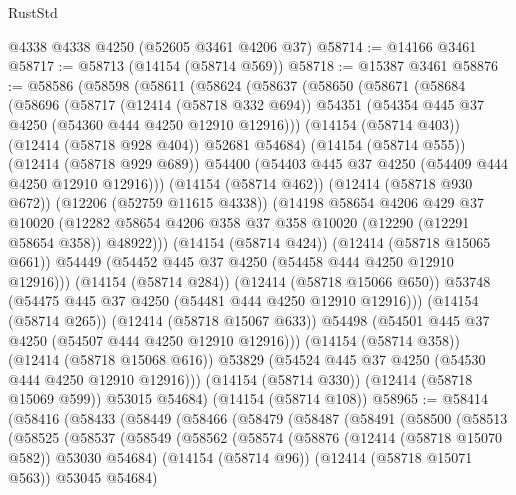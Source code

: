 \begin{lexlean}{RustStd}
\begin{coremodule}
    @4338
    @4338
    @4250
    (@52605 @3461 @4206 @37)
@58714 := @14166 @3461
@58717 := @58713 (@14154 (@58714 @569))
@58718 := @15387 @3461
@58876 := @58586
    (@58598
      (@58611
        (@58624
          (@58637
            (@58650
              (@58671
                (@58684
                  (@58696
                    (@58717
                      (@12414 (@58718 @332 @694))
                      @54351
                      (@54354 @445 @37 @4250 (@54360 @444 @4250 @12910 @12916)))
                    (@14154 (@58714 @403))
                    (@12414 (@58718 @928 @404))
                    @52681
                    @54684)
                  (@14154 (@58714 @555))
                  (@12414 (@58718 @929 @689))
                  @54400
                  (@54403 @445 @37 @4250 (@54409 @444 @4250 @12910 @12916)))
                (@14154 (@58714 @462))
                (@12414 (@58718 @930 @672))
                (@12206 (@52759 @11615 @4338))
                (@14198
                  @58654
                  @4206
                  @429
                  @37
                  @10020
                  (@12282 @58654 @4206 @358 @37 @358 @10020 (@12290 (@12291 @58654 @358)) @48922)))
              (@14154 (@58714 @424))
              (@12414 (@58718 @15065 @661))
              @54449
              (@54452 @445 @37 @4250 (@54458 @444 @4250 @12910 @12916)))
            (@14154 (@58714 @284))
            (@12414 (@58718 @15066 @650))
            @53748
            (@54475 @445 @37 @4250 (@54481 @444 @4250 @12910 @12916)))
          (@14154 (@58714 @265))
          (@12414 (@58718 @15067 @633))
          @54498
          (@54501 @445 @37 @4250 (@54507 @444 @4250 @12910 @12916)))
        (@14154 (@58714 @358))
        (@12414 (@58718 @15068 @616))
        @53829
        (@54524 @445 @37 @4250 (@54530 @444 @4250 @12910 @12916)))
      (@14154 (@58714 @330))
      (@12414 (@58718 @15069 @599))
      @53015
      @54684)
    (@14154 (@58714 @108))
@58965 := @58414
    (@58416
      (@58433
        (@58449
          (@58466
            (@58479
              (@58487
                (@58491
                  (@58500
                    (@58513
                      (@58525
                        (@58537
                          (@58549
                            (@58562
                              (@58574
                                (@58876 (@12414 (@58718 @15070 @582)) @53030 @54684)
                                (@14154 (@58714 @96))
                                (@12414 (@58718 @15071 @563))
                                @53045
                                @54684)

\end{coremodule}
\end{lexlean}
